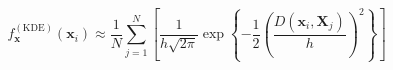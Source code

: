 \begin{equation}
    \label{eq:ad_kde}
    f_{\bm{x}}^{(\text{KDE})}(\bm{x}_i) \approx \frac{1}{N}\sum_{j = 1}^{N}\left[\frac{1}{h\sqrt{2\pi}}\exp\left\lbrace-\frac{1}{2}\left(\frac{D(\bm{x}_i,\bm{X}_j)}{h}\right)^2\right\rbrace\right]
\end{equation}
